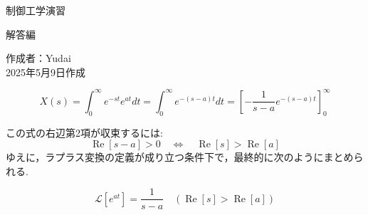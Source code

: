 \documentclass[a4paper,12pt]{article}
\begin{document}
\begin{titlepage}
    \centering
    \vspace*{2cm}
    {\LARGE {制御工学演習} \par}
    \vspace{1cm}
    {\Large 解答編 \par}
    \vfill
    \begin{flushright}
      \large
      作成者：Yudai\\
      2025年5月9日作成
    \end{flushright}
\end{titlepage}

\begin{tcolorbox}[title={[1] 指数関数 \(x(t) =e^{at}\) をラプラス変換せよ．}]

\vspace{2mm}

\[
X(s) =\int_0^{\infty} e^{-st} e^{at} dt =
\int_0^{\infty} e^{-(s-a)t} dt =
\left[ - \frac{1}{s-a} e^{-(s-a)t}\right]_0^{\infty} 
\]

\vspace{2mm}

\quad この式の右辺第2項が収束するには:
\[
\operatorname{Re}[s-a] > 0 \quad \Leftrightarrow \quad \operatorname{Re}[s] >
\operatorname{Re}[a]
\]
\quad ゆえに，ラプラス変換の定義が成り立つ条件下で，最終的に次のようにまとめられる.

\vspace{1mm}

\[
\boxed{{\mathcal{L}[e^{at}]=\frac{1}{s-a}} \quad (\operatorname{Re}[s] >\operatorname{Re}[a])}
\]

\vspace{2mm}

\end{tcolorbox}
\end{document}
